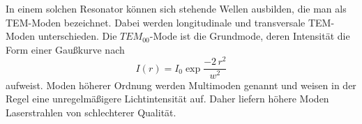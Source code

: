 \noindent
In einem solchen Resonator können sich stehende Wellen ausbilden, die man als TEM-Moden bezeichnet. Dabei werden longitudinale und transversale TEM-Moden unterschieden. Die $TEM_{00}$-Mode ist die Grundmode, deren Intensität die Form einer Gaußkurve nach 
\begin{equation}
  I(r) = I_0 \exp{\frac{-2 \, r^2}{w^2}}
  \label{eqn:gauss}
\end{equation}
\noindent
aufweist. Moden höherer Ordnung werden Multimoden genannt und weisen in der Regel eine unregelmäßigere Lichtintensität auf. Daher liefern höhere Moden Laserstrahlen von schlechterer Qualität.
